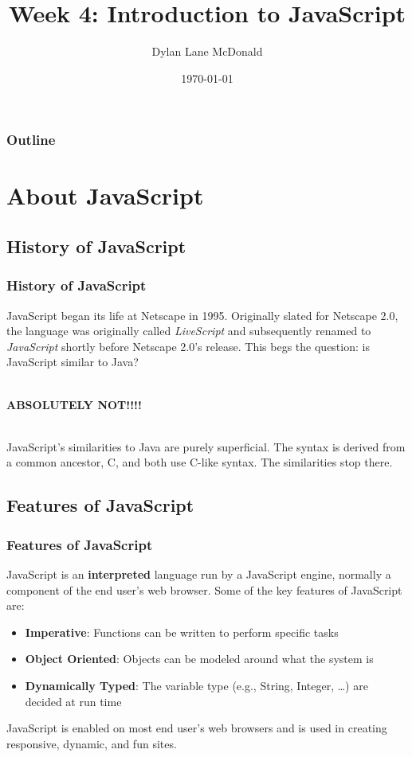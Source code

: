 \documentclass[aspectratio=169]{beamer}
\title{Week 4: Introduction to JavaScript}
\author{Dylan Lane McDonald}
\institute{CNM STEMulus Center\\Web Development with PHP}
\date{\today}
\begin{document}
\lstset{language=HTML}
\begin{frame}
\titlepage
\end{frame}

\begin{frame}
\frametitle{Outline}
\tableofcontents
\end{frame}

\section{About JavaScript}
\subsection{History of JavaScript}
\begin{frame}
\frametitle{History of JavaScript}
JavaScript began its life at Netscape in 1995. Originally slated for Netscape 2.0, the language was originally called \textit{LiveScript} and subsequently renamed to \textit{JavaScript} shortly before Netscape 2.0's release. This begs the question: is JavaScript similar to Java?

\mbox{}\\
\pause
\textbf{ABSOLUTELY NOT!!!!}

\mbox{}\\
\pause
JavaScript's similarities to Java are purely superficial. The syntax is derived from a common ancestor, C, and both use C-like syntax. The similarities stop there.
\end{frame}

\subsection{Features of JavaScript}
\begin{frame}
\frametitle{Features of JavaScript}
JavaScript is an \textbf{interpreted} language run by a JavaScript engine, normally a component of the end user's web browser. Some of the key features of JavaScript are:
\begin{itemize}
	\item \textbf{Imperative}: Functions can be written to perform specific tasks
	\item \textbf{Object Oriented}: Objects can be modeled around what the system is
	\item \textbf{Dynamically Typed}: The variable type (e.g., String, Integer, \dots) are decided at run time 
\end{itemize}
JavaScript is enabled on most end user's web browsers and is used in creating responsive, dynamic, and fun sites.
\end{frame}
\end{document}
